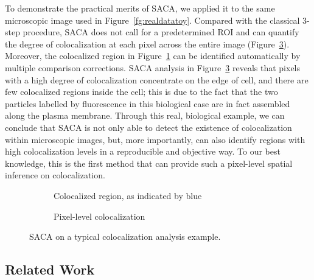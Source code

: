 \documentclass[10pt,twocolumn,twoside]{IEEEtran}
\begin{document}
To demonstrate the practical merits of SACA, we applied it to the same microscopic image used in Figure~\ref{fg:realdatatoy}.  Compared with the classical 3-step procedure, SACA does not call for a predetermined ROI and can quantify the degree of colocalization at each pixel across the entire image (Figure~\ref{fg:realdatatoylaca}). Moreover, the colocalized region in Figure~\ref{fg:toyregion} can be identified automatically by multiple comparison corrections. SACA analysis in Figure~\ref{fg:realdatatoylaca} reveals that pixels with a high degree of colocalization concentrate on the edge of cell, and there are few colocalized regions inside the cell; this is due to the fact that the two particles labelled by fluorescence in this biological case are in fact assembled along the plasma membrane. Through this real, biological example, we can conclude that SACA is not only able to detect the existence of colocalization within microscopic images, but, more importantly, can also identify regions with high colocalization levels in a reproducible and objective way. To our best knowledge, this is the first method that can provide such a pixel-level spatial inference on colocalization. 

\begin{figure}[h!]
    \centering
    \begin{subfigure}[b]{0.24\textwidth}
    \centering
        \caption{Colocalized region, as indicated by blue }
        \label{fg:toyregion}
    \end{subfigure}
    \begin{subfigure}[b]{0.24\textwidth}
     \centering
        \caption{Pixel-level colocalization}
        \label{fg:toylaca}
    \end{subfigure}
    \caption{SACA on a typical colocalization analysis example.}\label{fg:realdatatoylaca}
\end{figure}

\subsection{Related Work}
\end{document}
